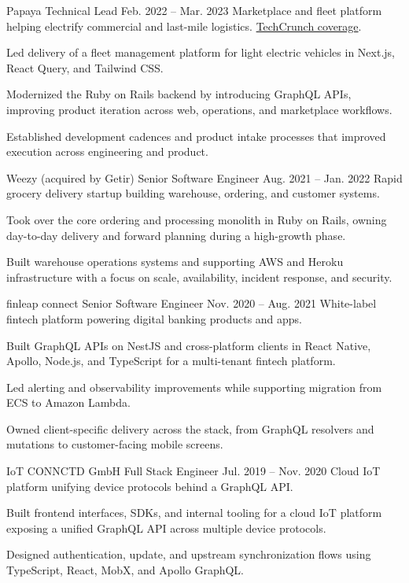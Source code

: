 \ResumeJob
  {Papaya}
  {Technical Lead}
  {Feb. 2022 -- Mar. 2023}
  {Marketplace and fleet platform helping electrify commercial and last-mile logistics. \href{https://techcrunch.com/2022/09/27/papaya-wants-to-help-electrify-last-mile-logistics-in-europe/}{TechCrunch coverage}.}
\begin{ResumeList}
  \item Led delivery of a fleet management platform for light electric vehicles in Next.js, React Query, and Tailwind CSS.
  \item Modernized the Ruby on Rails backend by introducing GraphQL APIs, improving product iteration across web, operations, and marketplace workflows.
  \item Established development cadences and product intake processes that improved execution across engineering and product.
\end{ResumeList}

\ResumeJob
  {Weezy (acquired by Getir)}
  {Senior Software Engineer}
  {Aug. 2021 -- Jan. 2022}
  {Rapid grocery delivery startup building warehouse, ordering, and customer systems.}
\begin{ResumeList}
  \item Took over the core ordering and processing monolith in Ruby on Rails, owning day-to-day delivery and forward planning during a high-growth phase.
  \item Built warehouse operations systems and supporting AWS and Heroku infrastructure with a focus on scale, availability, incident response, and security.
\end{ResumeList}

\ResumeJob
  {finleap connect}
  {Senior Software Engineer}
  {Nov. 2020 -- Aug. 2021}
  {White-label fintech platform powering digital banking products and apps.}
\begin{ResumeList}
  \item Built GraphQL APIs on NestJS and cross-platform clients in React Native, Apollo, Node.js, and TypeScript for a multi-tenant fintech platform.
  \item Led alerting and observability improvements while supporting migration from ECS to Amazon Lambda.
  \item Owned client-specific delivery across the stack, from GraphQL resolvers and mutations to customer-facing mobile screens.
\end{ResumeList}

\ResumeJob
  {IoT CONNCTD GmbH}
  {Full Stack Engineer}
  {Jul. 2019 -- Nov. 2020}
  {Cloud IoT platform unifying device protocols behind a GraphQL API.}
\begin{ResumeList}
  \item Built frontend interfaces, SDKs, and internal tooling for a cloud IoT platform exposing a unified GraphQL API across multiple device protocols.
  \item Designed authentication, update, and upstream synchronization flows using TypeScript, React, MobX, and Apollo GraphQL.
\end{ResumeList}

